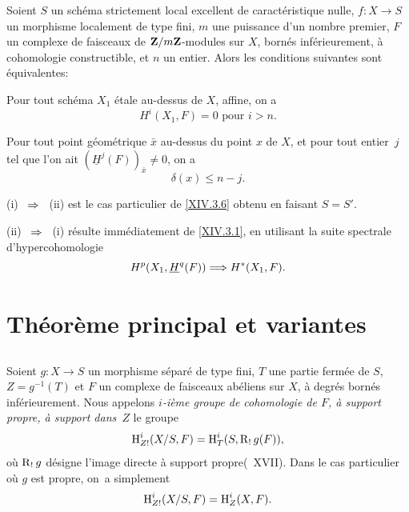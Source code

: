 \begin{corollaire} \label{XIV.3.7}
Soient $S$ un sch\'ema strictement local excellent de caract\'eristique nulle, $f:X \to S$ un morphisme localement de type fini, $m$ une puissance d'un nombre premier, $F$ un complexe de faisceaux de $\mathbf{Z}/m\mathbf{Z}$-modules sur $X$, born\'es inf\'erieurement, \`a cohomologie constructible, et $n$ un entier. Alors les conditions suivantes sont \'equivalentes:
\begin{enumeratei}
\item
Pour tout sch\'ema $X_1$ \'etale au-dessus de $X$, affine, on a
$$
H^i(X_1, F)=0\text{ pour }i>n.
$$

\item
Pour tout point g\'eom\'etrique $\bar{x}$ au-dessus du point $x$ de $X$, et pour tout entier~$j$ tel que l'on ait $(\underline{H}^j(F))_{\bar{x}} \neq 0$, on a
$$
\delta(x) \leq n-j.
$$
\end{enumeratei}
\end{corollaire}

\textup{(i)} ~$\To$~ \textup{(ii)} est le cas particulier de \ref{XIV.3.6} obtenu en faisant $S=S'$.

\textup{(ii)} ~$\To$~ \textup{(i)} r\'esulte imm\'ediatement de \ref{XIV.3.1}, en utilisant la suite spectrale d'hypercohomologie
$$
H^p(X_1, \underline{H}^q(F)) \To H^*(X_1, F).
$$

\section{Th\'eor\`eme principal et variantes} \label{XIV.4}

\setcounter{subsection}{-1}

\subsection{} \label{XIV.4.0}
Soient $g\colon X\to S$ un morphisme s\'epar\'e de type fini, $T$ une partie ferm\'ee de $S$, \hbox{$Z=g^{-1}(T)$} et $F$ un complexe de faisceaux ab\'eliens sur $X$, \`a degr\'es born\'es inf\'erieurement. Nous appelons \emph{$i$-ième groupe de cohomologie de $F$, à support propre, à support dans~$Z$} le groupe
$$
\operatorname{H}_{Z!}^{i}(X/S, F)=\operatorname{H}_{T}^{i}(S, \operatorname{R}_{!}g(F)),
$$
o\`u $\operatorname{R}_{!}g$ d\'esigne \og l'image directe \`a support propre\fg (~XVII). Dans le cas particulier o\`u $g$ est propre, on~a simplement
$$
\operatorname{H}_{Z!}^{i}(X/S, F)=\operatorname{H}_{Z}^{i}(X, F).
$$

